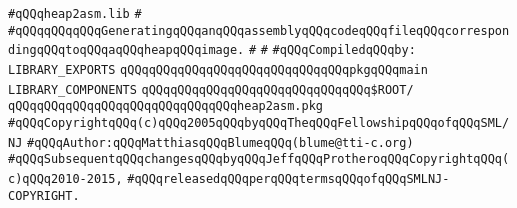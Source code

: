 \label{src/app/heap2asm/heap2asm.lib}
\verb|#qQQqheap2asm.lib|\newline
\verb|#|\newline
\verb|#qQQqqQQqqQQqGeneratingqQQqanqQQqassemblyqQQqcodeqQQqfileqQQqcorrespondingqQQqtoqQQqaqQQqheapqQQqimage.|\newline
\verb|#|\newline
\verb|#|\newline
\newline
\verb|#qQQqCompiledqQQqby:|\newline
\newline
\newline
\verb|LIBRARY_EXPORTS|\newline
\newline
\verb|qQQqqQQqqQQqqQQqqQQqqQQqqQQqqQQqpkgqQQqmain|\newline
\newline
\newline
\newline
\verb|LIBRARY_COMPONENTS|\newline
\newline
\verb|qQQqqQQqqQQqqQQqqQQqqQQqqQQqqQQq$ROOT/|\newline
\verb|qQQqqQQqqQQqqQQqqQQqqQQqqQQqqQQqheap2asm.pkg|\newline
\newline
\newline
\verb|#qQQqCopyrightqQQq(c)qQQq2005qQQqbyqQQqTheqQQqFellowshipqQQqofqQQqSML/NJ|\newline
\verb|#qQQqAuthor:qQQqMatthiasqQQqBlumeqQQq(blume@tti-c.org)|\newline
\verb|#qQQqSubsequentqQQqchangesqQQqbyqQQqJeffqQQqProtheroqQQqCopyrightqQQq(c)qQQq2010-2015,|\newline
\verb|#qQQqreleasedqQQqperqQQqtermsqQQqofqQQqSMLNJ-COPYRIGHT.|\newline

